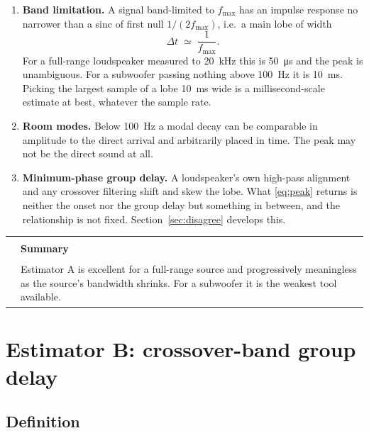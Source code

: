 \documentclass[11pt,a4paper]{article}
\makeatletter
\newenvironment{remark}[1]
  {\par\medskip\noindent\begin{tabular}{@{}p{0.03\textwidth}p{0.93\textwidth}@{}}
   \textcolor{smtblue}{\rule{2pt}{\baselineskip}} & \textbf{#1}\\[2pt] & \ignorespaces}
  {\end{tabular}\par\medskip}
\makeatother
\begin{document}
\begin{enumerate}[leftmargin=*]
\item \textbf{Band limitation.} A signal band-limited to $f_{\max}$ has an
  impulse response no narrower than a sinc of first null $1/(2 f_{\max})$, i.e.\
  a main lobe of width
  \begin{equation}
    \Delta t \;\simeq\; \frac{1}{f_{\max}}.
    \label{eq:lobe}
  \end{equation}
  For a full-range loudspeaker measured to \SI{20}{\kilo\hertz} this is
  \SI{50}{\micro\second} and the peak is unambiguous. For a subwoofer passing
  nothing above \SI{100}{\hertz} it is \SI{10}{\milli\second}. Picking the
  largest sample of a lobe \SI{10}{\milli\second} wide is a millisecond-scale
  estimate at best, whatever the sample rate.

\item \textbf{Room modes.} Below \SI{100}{\hertz} a modal decay can be
  comparable in amplitude to the direct arrival and arbitrarily placed in time.
  The peak may not be the direct sound at all.

\item \textbf{Minimum-phase group delay.} A loudspeaker's own high-pass
  alignment and any crossover filtering shift and skew the lobe. What
  \eqref{eq:peak} returns is neither the onset nor the group delay but something
  in between, and the relationship is not fixed. Section~\ref{sec:disagree}
  develops this.
\end{enumerate}

\begin{remark}{Summary}
Estimator A is excellent for a full-range source and progressively meaningless
as the source's bandwidth shrinks. For a subwoofer it is the weakest tool
available.
\end{remark}

\section{Estimator B: crossover-band group delay}
\label{sec:B}

\subsection{Definition}
\end{document}
